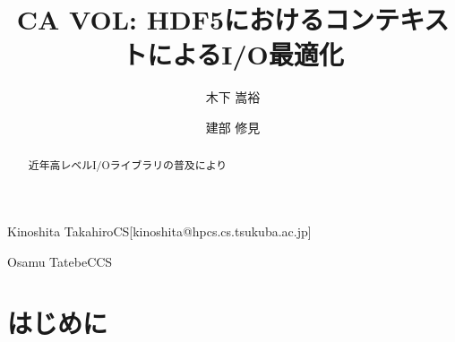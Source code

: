 \documentclass[submit,techrep,noauthor]{ipsj}
\begin{document}

\title{CA VOL: HDF5におけるコンテキストによるI/O最適化}

\author{木下 嵩裕}{Kinoshita Takahiro}{CS}[kinoshita@hpcs.cs.tsukuba.ac.jp]
\author{建部 修見}{Osamu Tatebe}{CCS}

\begin{abstract}
	近年高レベルI/Oライブラリの普及により
\end{abstract}

\maketitle

\section{はじめに}
\end{document}
